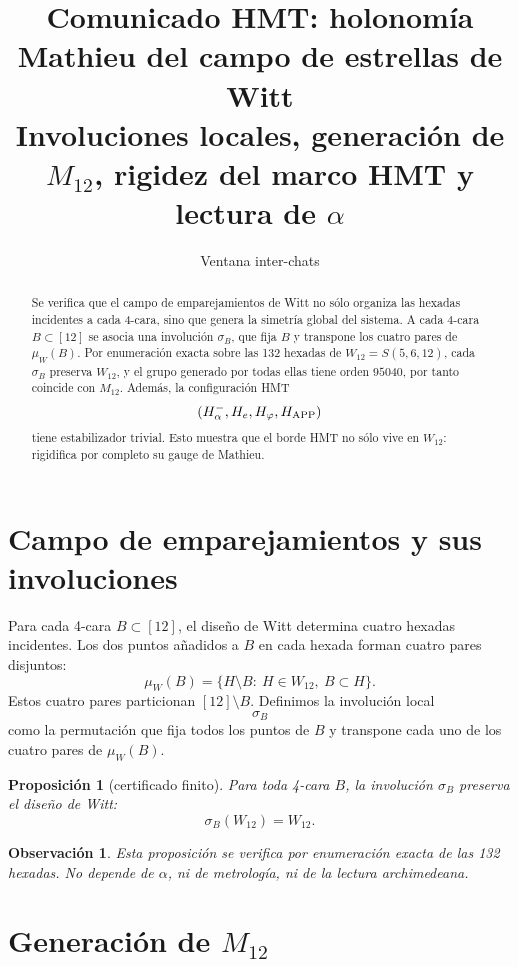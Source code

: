 \documentclass[11pt,a4paper]{article}
\title{\bfseries Comunicado HMT: holonomía Mathieu del campo de estrellas de Witt\\
\large Involuciones locales, generación de \(M_{12}\), rigidez del marco HMT y lectura de \(\alpha\)}
\author{Ventana inter-chats}
\date{}
\newtheorem{proposicion}[teorema]{Proposición}
\newtheorem{observacion}[teorema]{Observación}
\newcommand{\Halpha}{H_\alpha^-}
\newcommand{\He}{H_e}
\newcommand{\Hphi}{H_\varphi}
\newcommand{\Happ}{H_{\rm APP}}
\begin{document}
\maketitle

\begin{abstract}
Se verifica que el campo de emparejamientos de Witt no sólo organiza las hexadas incidentes a cada 4-cara, sino que genera la simetría global del sistema. A cada 4-cara \(B\subset[12]\) se asocia una involución \(\sigma_B\), que fija \(B\) y transpone los cuatro pares de \(\mu_W(B)\). Por enumeración exacta sobre las 132 hexadas de \(W_{12}=S(5,6,12)\), cada \(\sigma_B\) preserva \(W_{12}\), y el grupo generado por todas ellas tiene orden \(95040\), por tanto coincide con \(M_{12}\). Además, la configuración HMT
\[
(\Halpha,\He,\Hphi,\Happ)
\]
tiene estabilizador trivial. Esto muestra que el borde HMT no sólo vive en \(W_{12}\): rigidifica por completo su gauge de Mathieu.
\end{abstract}

\section{Campo de emparejamientos y sus involuciones}

Para cada 4-cara \(B\subset[12]\), el diseño de Witt determina cuatro hexadas incidentes. Los dos puntos añadidos a \(B\) en cada hexada forman cuatro pares disjuntos:
\[
\mu_W(B)=\{H\setminus B:\ H\in W_{12},\ B\subset H\}.
\]
Estos cuatro pares particionan \([12]\setminus B\). Definimos la involución local
\[
\sigma_B
\]
como la permutación que fija todos los puntos de \(B\) y transpone cada uno de los cuatro pares de \(\mu_W(B)\).

\begin{proposicion}[certificado finito]
Para toda 4-cara \(B\), la involución \(\sigma_B\) preserva el diseño de Witt:
\[
\sigma_B(W_{12})=W_{12}.
\]
\end{proposicion}

\begin{observacion}
Esta proposición se verifica por enumeración exacta de las 132 hexadas. No depende de \(\alpha\), ni de metrología, ni de la lectura archimedeana.
\end{observacion}

\section{Generación de \(M_{12}\)}
\end{document}
